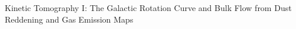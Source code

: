 Kinetic Tomography I: The Galactic Rotation Curve and Bulk Flow from Dust Reddening and Gas Emission Maps